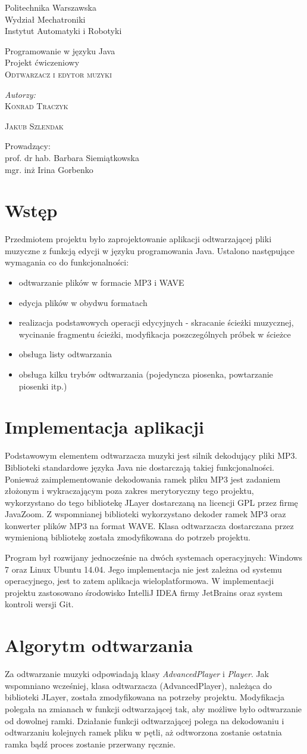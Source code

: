 \documentclass[12pt,a4paper,notitlepage]{article}
\makeatletter
\renewcommand{\maketitle}{\begin{titlepage}

    \vspace*{1cm}

    \begin{center}\small

   	 Politechnika Warszawska\\
    	Wydział Mechatroniki\\
 	Instytut Automatyki i Robotyki
    \end{center}
    \vspace{3cm}


    \begin{center}

	\small
	Programowanie w języku Java \\
	Projekt ćwiczeniowy \\
	
      \LARGE \textsc{Odtwarzacz i edytor muzyki}

         \end{center}


    \vspace{5.5cm}

    \begin{flushright}

    \begin{minipage}{5cm}

    \textit{\small Autorzy:}\\

    \normalsize \textsc{Konrad Traczyk} \par
    \normalsize \textsc{Jakub Szlendak} \par

    \end{minipage}

    \vspace{5cm}

     {\small Prowadzący:}\\
 
         {prof. dr hab. Barbara Siemiątkowska}\\	
         {mgr. inż Irina Gorbenko}

     \end{flushright}

    \vspace*{\stretch{6}}

    \begin{center}

    \@date

    \end{center}

  \end{titlepage}%

}
\makeatother
\begin{document}
\maketitle

\section{Wstęp}
\label{sec:wstep}

Przedmiotem projektu było zaprojektowanie aplikacji odtwarzającej pliki muzyczne z funkcją edycji w języku programowania Java. Ustalono następujące wymagania co do funkcjonalności:
\begin{itemize}
 \item odtwarzanie plików w formacie MP3 i WAVE
 \item edycja plików w obydwu formatach
 \item realizacja podstawowych operacji edycyjnych - skracanie ścieżki muzycznej, wycinanie fragmentu ścieżki, modyfikacja poszczególnych próbek w ścieżce
 \item obsługa listy odtwarzania
 \item obsługa kilku trybów odtwarzania (pojedyncza piosenka, powtarzanie piosenki itp.)
\end{itemize}

\section{Implementacja aplikacji}
\label{sec:implementacja}
Podstawowym elementem odtwarzacza muzyki jest silnik dekodujący pliki MP3. Biblioteki standardowe języka Java nie dostarczają takiej funkcjonalności.
Ponieważ zaimplementowanie dekodowania ramek pliku MP3 jest zadaniem złożonym i wykraczającym poza zakres merytoryczny tego projektu, wykorzystano do tego bibliotekę JLayer dostarczaną na licencji 
GPL przez firmę JavaZoom. Z wspomnianej biblioteki wykorzystano dekoder ramek MP3 oraz konwerter plików MP3 na format WAVE. Klasa odtwarzacza dostarczana przez wymienioną bibliotekę została zmodyfikowana do potrzeb projektu. 

Program był rozwijany jednocześnie na dwóch systemach operacyjnych: Windows 7 oraz Linux Ubuntu 14.04. Jego implementacja nie jest zależna od systemu operacyjnego, jest to zatem aplikacja wieloplatformowa. 
W implementacji projektu zastosowano środowisko IntelliJ IDEA firmy JetBrains oraz system kontroli wersji Git.
\section{Algorytm odtwarzania}
\label{sec:odtwarzanie}
Za odtwarzanie muzyki odpowiadają klasy \emph{AdvancedPlayer} i \emph{Player}.   
Jak wspomniano wcześniej, klasa odtwarzacza (AdvancedPlayer), należąca do biblioteki JLayer, została zmodyfikowana na potrzeby projektu. Modyfikacja polegała na zmianach w funkcji odtwarzającej tak, 
aby możliwe było odtwarzanie od dowolnej ramki. Działanie funkcji odtwarzającej polega na dekodowaniu i odtwarzaniu kolejnych ramek pliku w pętli, aż odtworzona zostanie ostatnia ramka
bądź proces zostanie przerwany ręcznie. 
\end{document}
